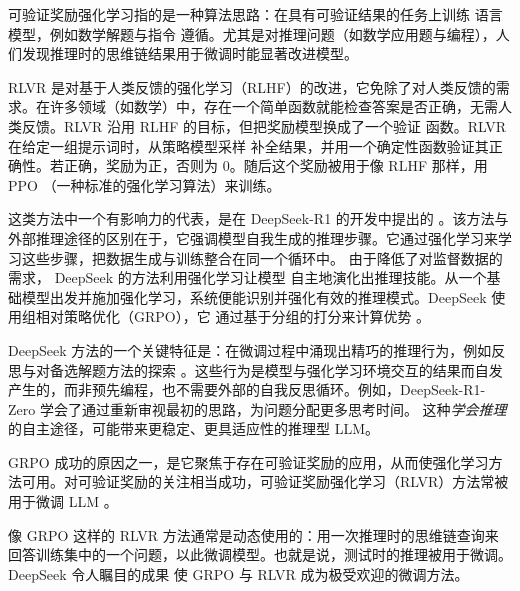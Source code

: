 可验证奖励强化学习指的是一种算法思路：在具有可验证结果的任务上训练
语言模型，例如数学解题与指令
遵循。尤其是对推理问题（如数学应用题与编程），人们发现推理时的思维链结果用于微调时能显著改进模型。

RLVR 是对基于人类反馈的强化学习（RLHF）的改进，它免除了对人类反馈的需求。在许多领域（如数学）中，存在一个简单函数就能检查答案是否正确，无需人类反馈。RLVR 沿用 RLHF 的目标，但把奖励模型换成了一个验证
函数。RLVR 在给定一组提示词时，从策略模型采样
补全结果，并用一个确定性函数验证其正确性。若正确，奖励为正，否则为 0。随后这个奖励被用于像 RLHF 那样，用 PPO \citep{schulman2017proximal}（一种标准的强化学习算法）来训练。


这类方法中一个有影响力的代表，是在 DeepSeek-R1 的开发中提出的 \cite{guo2025deepseek}。该方法与外部推理途径的区别在于，它强调模型自我生成的推理步骤。它通过强化学习来学习这些步骤，把数据生成与训练整合在同一个循环中。%
由于降低了对监督数据的需求，
DeepSeek 的方法利用强化学习让模型%
自主地演化出推理技能。从一个基础模型出发并施加强化学习，系统便能识别并强化有效的推理模式。DeepSeek 使用组相对策略优化（GRPO），它%
通过基于分组的打分来计算优势 \citep{shao2024deepseekmath}。%

DeepSeek 方法的一个关键特征是：在微调过程中涌现出精巧的推理行为，例如反思与对备选解题方法的探索 \citep{mercer2025brief}。这些行为是模型与强化学习环境交互的结果而自发产生的，而非预先编程，也不需要外部的自我反思循环。例如，DeepSeek-R1-Zero 学会了通过重新审视最初的思路，为问题分配更多思考时间。
这种{\em 学会推理}的自主途径，可能带来更稳定、更具适应性的推理型 LLM。




GRPO 成功的原因之一，是它聚焦于存在可验证奖励的应用，从而使强化学习方法可用。对可验证奖励的关注相当成功，可验证奖励强化学习（RLVR）方法常被用于微调 LLM \citep{lambert2024tulu}。



像 GRPO 这样的 RLVR 方法通常是动态使用的：用一次推理时的思维链查询来回答训练集中的一个问题，以此微调模型。也就是说，测试时的推理被用于微调。
%
DeepSeek 令人瞩目的成果 \citep{guo2025deepseek} 使 GRPO \citep{shao2024deepseekmath} 与 RLVR \citep{lambert2024tulu,guo2025deepseek,wen2025reinforcement,yue2025does} 成为极受欢迎的微调方法。

